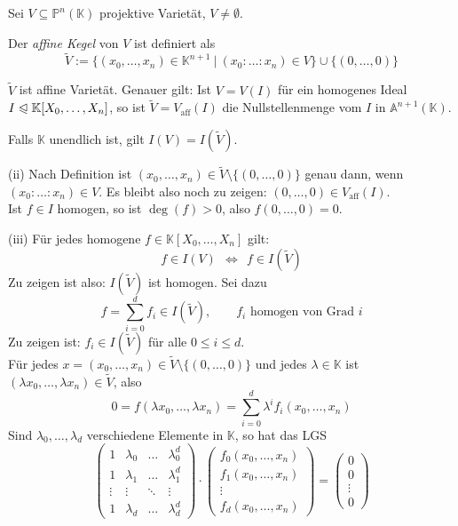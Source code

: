 \documentclass[11pt]{book}
\theoremstyle{nonumberbreak}
\newenvironment{pr}[1][]{\ifthenelse{\equal{#1}{}}{\proof}{\proof[#1]}\rm}{\endproof}
\newenvironment{definbem}[1][]{\ifthenelse{\equal{#1}{}}{\definibem}{\definibem[#1]}\rm}{\enddefinibem}
\begin{document}
\begin{spacing}{1.3}
\begin{definbem}
Sei $V \subseteq \mathbb{P}^n(\mathbb{K})$ projektive Varietät, $V \neq \emptyset$.
\begin{compactenum}
\item Der \textit{affine Kegel} von $V$ ist definiert als
$$\tilde{V} := \{ (x_0 ,\ldots ,x_n) \in \mathbb{K}^{n+1} \ \vert \ (x_0: \ldots : x_n) \in V \} \cup \{(0, \ldots, 0 )\}$$
\item $\tilde{V}$ ist affine Varietät. Genauer gilt: Ist $V=V(I)$ für ein homogenes Ideal $I \trianglelefteqslant \mathbb{K}[X_0, \ldots, X_n]$, so ist $\tilde{V}=V_{\textrm{aff}}(I)$ die Nullstellenmenge vom $I$ in $\mathbb{A}^{n+1}(\mathbb{K})$.
\item Falls $\mathbb{K}$ unendlich ist, gilt $I(V)=I(\tilde{V})$.
\end{compactenum}
\begin{pr}
\begin{compactenum}
\item[(ii)] Nach Definition ist $(x_0, \ldots, x_n) \in \tilde{V} \setminus\{(0, \ldots, 0 )\}$ genau dann, wenn $(x_0: \ldots : x_n) \in V$. Es bleibt also noch zu zeigen: $(0, \ldots, 0) \in V_{\textrm{aff}}(I)$.\\
Ist $f \in I$ homogen, so ist $\deg(f) >0$, also $f(0, \ldots, 0 ) = 0$.
\item[(iii)] Für jedes homogene $f \in \mathbb{K}[X_0, \ldots, X_n]$ gilt:
$$f \in I(V) \ \ \Longleftrightarrow \ \ f \in I(\tilde{V})$$
Zu zeigen ist also: $I(\tilde{V})$ ist homogen. Sei dazu 
$$f= \sum_{i=0}^d f_i \in I(\tilde{V}), \qquad f_i \textrm{ homogen von Grad } i$$
Zu zeigen ist: $f_i \in I(\tilde{V})$ für alle $0 \leqslant i \leqslant d $.\\
Für jedes $x=(x_0, \ldots, x_n) \in \tilde{V} \setminus \{(0, \ldots, 0 ) \}$ und jedes $ \lambda \in \mathbb{K}$ ist $(\lambda x_0, \ldots, \lambda x_n) \in \tilde{V}$, also
$$0= f(\lambda x_0, \ldots, \lambda x_n) = \sum_{i=0}^d \lambda^{i} f_i(x_0, \ldots, x_n)$$
Sind $\lambda_0, \ldots, \lambda_d$ verschiedene Elemente in $\mathbb{K}$, so hat das LGS
$$\begin{pmatrix} 1 & \lambda_0 & \ldots & \lambda_0^d \\ 1 & \lambda_1 & \ldots & \lambda_1^d \\ \vdots & \vdots & \ddots & \vdots \\ 1 & \lambda_d & \ldots & \lambda_d^d \end{pmatrix} \cdot \begin{pmatrix} f_0(x_0, \ldots, x_n) \\ f_1(x_0, \ldots, x_n) \\ \vdots \\ f_d(x_0, \ldots, x_n) \end{pmatrix} = \begin{pmatrix} 0 \\ 0 \\ \vdots \\ 0 \end{pmatrix}$$

\end{compactenum}
\end{pr}
\end{definbem}
\end{spacing}
\end{document}
